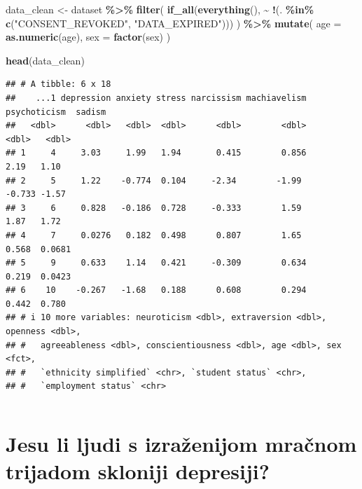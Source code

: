 \documentclass[
]{article}
\newenvironment{Shaded}{\begin{snugshade}}{\end{snugshade}}
\newcommand{\AttributeTok}[1]{\textcolor[rgb]{0.13,0.29,0.53}{#1}}
\newcommand{\FunctionTok}[1]{\textcolor[rgb]{0.13,0.29,0.53}{\textbf{#1}}}
\newcommand{\NormalTok}[1]{#1}
\newcommand{\OtherTok}[1]{\textcolor[rgb]{0.56,0.35,0.01}{#1}}
\newcommand{\SpecialCharTok}[1]{\textcolor[rgb]{0.81,0.36,0.00}{\textbf{#1}}}
\newcommand{\StringTok}[1]{\textcolor[rgb]{0.31,0.60,0.02}{#1}}
\begin{document}
\begin{Shaded}
\begin{Highlighting}[]
\NormalTok{data\_clean }\OtherTok{\textless{}{-}}\NormalTok{ dataset }\SpecialCharTok{\%\textgreater{}\%}
  \FunctionTok{filter}\NormalTok{(}
    \FunctionTok{if\_all}\NormalTok{(}\FunctionTok{everything}\NormalTok{(),}
           \SpecialCharTok{\textasciitilde{}} \SpecialCharTok{!}\NormalTok{(. }\SpecialCharTok{\%in\%} \FunctionTok{c}\NormalTok{(}\StringTok{"CONSENT\_REVOKED"}\NormalTok{, }\StringTok{"DATA\_EXPIRED"}\NormalTok{)))}
\NormalTok{  ) }\SpecialCharTok{\%\textgreater{}\%}
  \FunctionTok{mutate}\NormalTok{(}
    \AttributeTok{age =} \FunctionTok{as.numeric}\NormalTok{(age),}
    \AttributeTok{sex =} \FunctionTok{factor}\NormalTok{(sex)}
\NormalTok{  )}


\FunctionTok{head}\NormalTok{(data\_clean)}
\end{Highlighting}
\end{Shaded}

\begin{verbatim}
## # A tibble: 6 x 18
##    ...1 depression anxiety stress narcissism machiavelism psychoticism  sadism
##   <dbl>      <dbl>   <dbl>  <dbl>      <dbl>        <dbl>        <dbl>   <dbl>
## 1     4     3.03     1.99   1.94       0.415        0.856        2.19   1.10  
## 2     5     1.22    -0.774  0.104     -2.34        -1.99        -0.733 -1.57  
## 3     6     0.828   -0.186  0.728     -0.333        1.59         1.87   1.72  
## 4     7     0.0276   0.182  0.498      0.807        1.65         0.568  0.0681
## 5     9     0.633    1.14   0.421     -0.309        0.634        0.219  0.0423
## 6    10    -0.267   -1.68   0.188      0.608        0.294        0.442  0.780 
## # i 10 more variables: neuroticism <dbl>, extraversion <dbl>, openness <dbl>,
## #   agreeableness <dbl>, conscientiousness <dbl>, age <dbl>, sex <fct>,
## #   `ethnicity simplified` <chr>, `student status` <chr>,
## #   `employment status` <chr>
\end{verbatim}

\begin{verbatim}
\end{verbatim}

\section{Jesu li ljudi s izraženijom mračnom trijadom skloniji
depresiji?}\label{jesu-li-ljudi-s-izraux17eenijom-mraux10dnom-trijadom-skloniji-depresiji}
\end{document}
